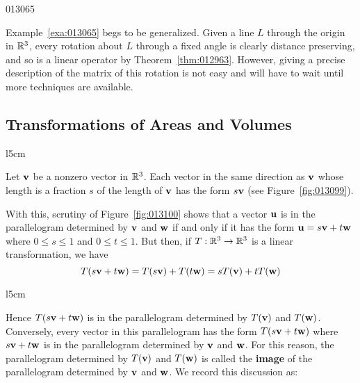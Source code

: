 \begin{example}{}{013065}
\begin{solution}
\end{solution}
\end{example}

Example~\ref{exa:013065} begs to be generalized. Given a line $L$ through the origin in $\mathbb{R}^3$, every rotation about $L$ through a fixed angle is clearly distance preserving, and so is a linear operator by Theorem~\ref{thm:012963}.
 However, giving a precise description of the matrix of this rotation is
 not easy and will have to wait until more techniques are available.


\subsection*{Transformations of Areas and Volumes}

\begin{wrapfigure}{l}{5cm} 
\centering

\caption{\label{fig:013099}}
\end{wrapfigure}

Let $\textbf{v}$ be a nonzero vector in $\mathbb{R}^3$. Each vector in the same direction as $\textbf{v}$ whose length is a fraction $s$ of the length of $\textbf{v}$ has the form $s\textbf{v}$ (see Figure~\ref{fig:013099}).

With this, scrutiny of Figure~\ref{fig:013100} shows that a vector $\textbf{u}$ is in the parallelogram determined by $\textbf{v}$ and $\textbf{w}$ if and only if it has the form $\textbf{u} = s\textbf{v} + t\textbf{w}$ where $0 \leq s \leq 1$ and $0 \leq t \leq 1$. But then, if $T : \mathbb{R}^3 \to \mathbb{R}^3$ is a linear transformation, we have
\begin{equation*}
T(s\textbf{v} + t\textbf{w}) = T(s\textbf{v}) + T(t\textbf{w}) = sT(\textbf{v}) + tT(\textbf{w})
\end{equation*}

\begin{wrapfigure}[6]{l}{5cm} 
\vspace{-2em}
\centering

\caption{\label{fig:013100}}
\end{wrapfigure}

\noindent Hence $T(s\textbf{v} + t\textbf{w})$ is in the parallelogram determined by $T(\textbf{v})$ and $T(\textbf{w})$. Conversely, every vector in this parallelogram has the form $T(s\textbf{v} + t\textbf{w})$ where $s\textbf{v} + t\textbf{w}$ is in the parallelogram determined by $\textbf{v}$ and $\textbf{w}$. For this reason, the parallelogram determined by $T(\textbf{v})$ and $T(\textbf{w})$ is called the \textbf{image} of the parallelogram determined by $\textbf{v}$ and $\textbf{w}$. We record this discussion as:

